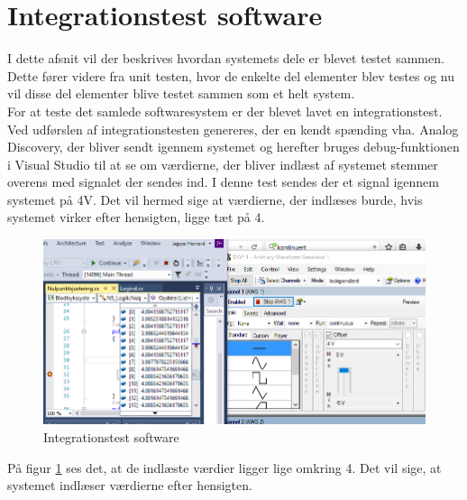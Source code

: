 \section{Integrationstest software}
I dette afsnit vil der beskrives hvordan systemets dele er blevet testet sammen. Dette fører videre fra unit testen, hvor de enkelte del elementer blev testes og nu vil disse del elementer blive testet sammen som et helt system. \\
For at teste det samlede softwaresystem er der blevet lavet en integrationstest. Ved udførslen af integrationstesten genereres, der en kendt spænding vha. Analog Discovery, der bliver sendt igennem systemet og herefter bruges debug-funktionen i Visual Studio til at se om værdierne, der bliver indlæst af systemet stemmer overens med signalet der sendes ind.
I denne test sendes der et signal igennem systemet på 4V. Det vil hermed sige at værdierne, der indlæses burde, hvis systemet virker efter hensigten, ligge tæt på 4.
\begin{figure}[H]
	\centering
	\includegraphics[width=1\textwidth]{Figurer/Softwareimplementering/Integrationstest}
	\caption{Integrationstest software}
	\label{fig:integrationstestsoftware}
\end{figure}
På figur \ref{fig:integrationstestsoftware} ses det, at de indlæste værdier ligger lige omkring 4. Det vil sige, at systemet indlæser værdierne efter hensigten.   

